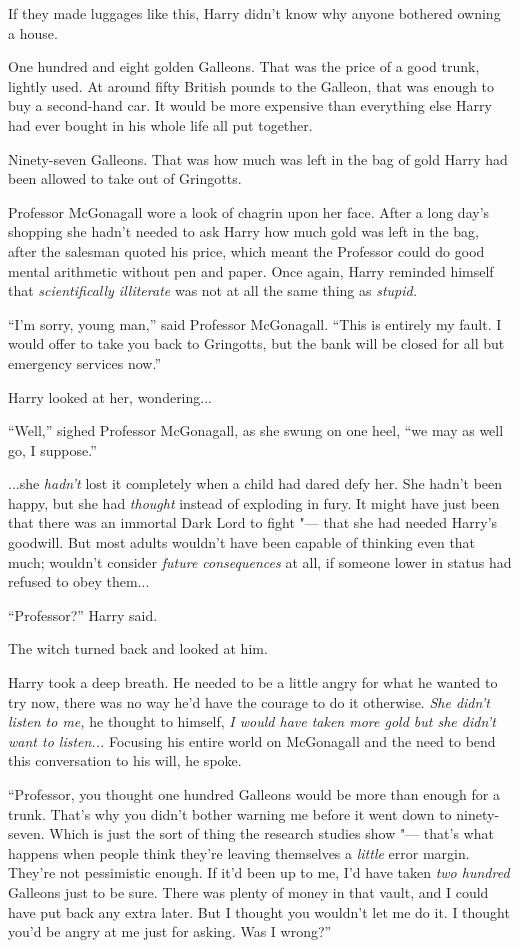 If they made luggages like this, Harry didn't know why anyone bothered
owning a house.

One hundred and eight golden Galleons. That was the price of a good
trunk, lightly used. At around fifty British pounds to the Galleon, that
was enough to buy a second-hand car. It would be more expensive than
everything else Harry had ever bought in his whole life all put
together.

Ninety-seven Galleons. That was how much was left in the bag of gold
Harry had been allowed to take out of Gringotts.

Professor McGonagall wore a look of chagrin upon her face. After a long
day's shopping she hadn't needed to ask Harry how much gold was left in
the bag, after the salesman quoted his price, which meant the Professor
could do good mental arithmetic without pen and paper. Once again, Harry
reminded himself that \emph{scientifically illiterate} was not at all
the same thing as \emph{stupid.}

``I'm sorry, young man,'' said Professor McGonagall. ``This is entirely
my fault. I would offer to take you back to Gringotts, but the bank will
be closed for all but emergency services now.''

Harry looked at her, wondering...

``Well,'' sighed Professor McGonagall, as she swung on one heel, ``we
may as well go, I suppose.''

...she \emph{hadn't} lost it completely when a child had dared defy
her. She hadn't been happy, but she had \emph{thought} instead of
exploding in fury. It might have just been that there was an immortal
Dark Lord to fight "--- that she had needed Harry's goodwill. But most
adults wouldn't have been capable of thinking even that much; wouldn't
consider \emph{future consequences} at all, if someone lower in status
had refused to obey them...

``Professor?'' Harry said.

The witch turned back and looked at him.

Harry took a deep breath. He needed to be a little angry for what he
wanted to try now, there was no way he'd have the courage to do it
otherwise. \emph{She didn't listen to me,} he thought to himself,
\emph{I would have taken more gold but she didn't want to
listen...} Focusing his entire world on McGonagall and the need to
bend this conversation to his will, he spoke.

``Professor, you thought one hundred Galleons would be more than enough
for a trunk. That's why you didn't bother warning me before it went down
to ninety-seven. Which is just the sort of thing the research studies
show "--- that's what happens when people think they're leaving themselves
a \emph{little} error margin. They're not pessimistic enough. If it'd
been up to me, I'd have taken \emph{two hundred} Galleons just to be
sure. There was plenty of money in that vault, and I could have put back
any extra later. But I thought you wouldn't let me do it. I thought
you'd be angry at me just for asking. Was I wrong?''

